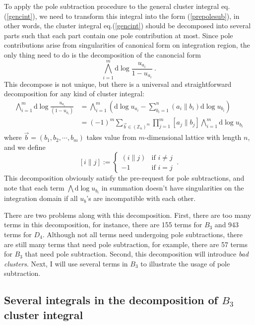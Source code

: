 \documentclass[12pt]{article}
\theoremstyle{definition}
\theoremstyle{plain}
\newcommand{\dif}{\mathrm{d}} %
\begin{document}
To apply the pole subtraction procedure to the general cluster integral eq.(\ref{gencint}), we need to transform this integral into the form (\ref{prepolesub}), in other words, the cluster integral eq.(\ref{gencint}) should be decomposed into several parts such that each part contain one pole contribution at most. Since pole contributions arise from singularities of canonical form on integration region, the only thing need to do is the decomposition of the canoncial form
\[
  \bigwedge_{i=1}^{m}\dif \log\frac{u_{a_{i}}}{1-u_{a_{i}}}\:.    
\]
This decompose is not unique, but there is a universal and straightforward decomposition for any kind of cluster integral:
\begin{align}
    \bigwedge_{i=1}^{m}\dif \log \frac{ u_{a_{i}}}{(1-u_{a_{i}})} &=
    \bigwedge_{i=1}^{m}\left(\dif\log u_{a_{i}}-\sum_{b_{i}=1}^{n}(a_{i}\parallel b_{i})\dif\log u_{b_{i}}\right) \nonumber  \\
    &=(-1)^{m}\sum_{\vec{b}\in (\mathds{Z}_{n})^{m}} \prod_{j=1}^{m}[a_{j}\parallel b_{j}] \bigwedge_{i=1}^{m}\dif\log u_{b_{i}}
\end{align}
where $\vec{b}=(b_{1},b_{2},\cdots,b_{m})$ takes value from $m$-dimensional lattice with length $n$, and we define
\[
 [i\parallel j] :=\begin{cases}
    (i\parallel j) & \text{if }i\neq j \\
    -1 & \text{if }i=j
 \end{cases}    \:.
\]  
This decomposition obviously satisfy the pre-request for pole subtractions, and note that each term $\bigwedge \dif \log u_{b_{i}}$ in summation doesn't have singularities on the integration domain if all $u_{b}$'s are incompatible with each other.       

There are two problems along with this decomposition. First, there are too many terms in this decomposition, for instance, there are 155 terms for $B_{3}$ and 943 terms for $D_{4}$. Although not all terms need undergoing pole subtractions, there are still many terms that need pole subtraction, for example, there are 57 terms for $B_{3}$ that need pole subtraction. Second, this decomposition will introduce \emph{bad clusters}. Next, I will use several terms in $B_{3}$ to illustrate the usage of pole subtraction.

\subsection{Several integrals in the decomposition of $B_{3}$ cluster integral}
\end{document}
